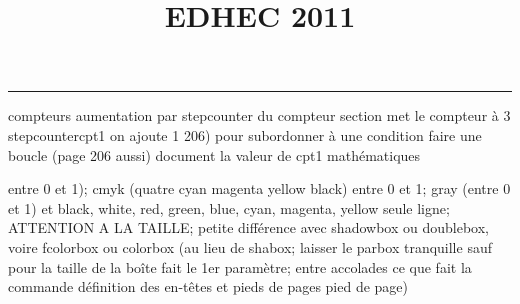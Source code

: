 \documentclass[11pt]{article}%
\title{\bf \vspace{-2cm} EDHEC 2011} %
\author{} %
\date{} %
\renewcommand{\headrulewidth}{0pt}%
\renewcommand{\footrulewidth}{0.4pt}%
\begin{document}
\maketitle %
\vspace{-1.4cm}\hrule %
\thispagestyle{fancy}

\vspace*{.2cm}



compteurs%
aumentation par stepcounter du compteur section%
met le compteur à 3%
stepcounter{cpt1} on ajoute 1%
206) pour subordonner à une condition %
faire une boucle (page 206 aussi) %
document la valeur de cpt1 
mathématiques\newcommand{\ch}{\operatorname{ch}} 
\newcommand{\sh}{\operatorname{sh}}
\renewcommand{\tanh}{\operatorname{th}}
\renewcommand{\sinh}{\operatorname{sh}}
\renewcommand{\cosh}{\operatorname{ch}}
\newcommand{\argsh}{\operatorname{argsh}}
\newcommand{\argch}{\operatorname{argch}}
\newcommand{\argth}{\operatorname{argth}}
\newcommand{\ker}{\operatorname{Ker}}
\renewcommand{\im}{\operatorname{Im}}
\newcommand{\rg}{\operatorname{rg}}
\newcommand{\Id}{\operatorname{Id}}
\newcommand{\id}{\operatorname{id}}
\renewcommand{\leq}{\leq}
\renewcommand{\geq}{\geq }

entre 0 et 1); cmyk (quatre cyan magenta yellow black) entre 0 et 1;
gray (entre 0 et 1) et black, white, red, green, blue, cyan, magenta,
yellow%
seule ligne; ATTENTION A LA TAILLE; petite différence avec shadowbox ou
doublebox, voire fcolorbox ou colorbox (au lieu de shabox; laisser le
parbox tranquille sauf pour la taille de la boîte
\newcommand{\Tbox}[1]{\begin{center} \shabox{\parbox{0.6
\linewidth}{#1}} \end{center}} %
fait le 1er paramètre; entre accolades ce que fait la commande
définition des en-têtes et pieds de pages\pagestyle{fancy}
\chead{}
\rfoot[ \ \thepage]{\thepage}
\cfoot{}
\lfoot{}
\thispagestyle{fancy} %
pied de page)\renewcommand{\footrulewidth}{0.4pt}
\renewcommand{\headrulewidth}{0.4pt}
\end{document}
